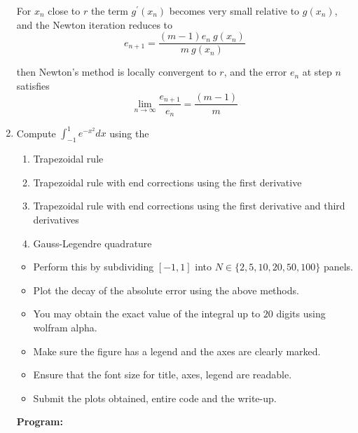 \documentclass[a4paper,11pt]{report}
\begin{document}
\begin{enumerate}
    For $x_{n}$ close to $r$ the term $g^{\prime}(x_{n})$ becomes very small relative to $g(x_{n})$, and the Newton iteration reduces to
    \begin{equation*}
    e_{n+1} = \frac{(m-1)e_{n}\ g(x_{n})}{m\ g(x_{n})}
    \end{equation*}

    then Newton's method is locally convergent to $r$, and the error $e_{n}$ at step $n$ satisfies
    \begin{equation*}
    \lim_{n \rightarrow \infty} \frac{e_{n+1}}{e_{n}} = \frac{(m-1)}{m}
    \end{equation*}








    \item Compute $\displaystyle \int_{-1}^{1} e^{-x^{2}} dx$ using the

    \begin{enumerate}
    \item Trapezoidal rule
    \item Trapezoidal rule with end corrections using the first derivative
    \item Trapezoidal rule with end corrections using the first derivative and third
    derivatives
    \item Gauss-Legendre quadrature
    \end{enumerate}

    \begin{itemize}
    \item Perform this by subdividing $[-1, 1]$ into $N \in \{2, 5, 10, 20, 50, 100\}$ 
    panels.
    \item Plot the decay of the absolute error using the above methods.
    \item You may obtain the exact value of the integral up to $20$ digits using
    wolfram alpha.
    \item Make sure the figure has a legend and the axes are clearly marked.
    \item Ensure that the font size for title, axes, legend are readable.
    \item Submit the plots obtained, entire code and the write-up.
    \end{itemize}
        
    \textbf{Program:}
    

    \begin{figure}[ht!]
    \centering
    \resizebox{0.9\linewidth}{!}{}
    \end{figure}


\end{enumerate}
\end{document}

